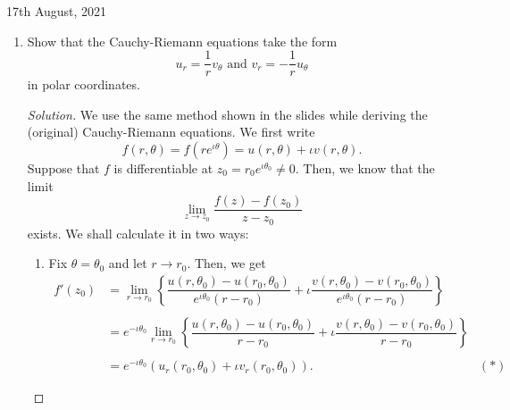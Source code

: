 \documentclass[11pt]{article}
\theoremstyle{definition}
\newenvironment{soln}{\begin{proof}[Solution]}{\end{proof}}
\begin{document}
\begin{center}
    17th August, 2021
\end{center}
\begin{enumerate}[leftmargin=*]
    \itemsep0.5em
    \item Show that the Cauchy-Riemann equations take the form 
    \[
        u_r = \frac{1}{r} v_{\theta} \text{ and } v_r = -\frac{1}{r} u_{\theta} 
    \]
    in polar coordinates.
    
    \begin{soln}
    We use the same method shown in the slides while deriving the (original) Cauchy-Riemann equations. We first write
		\[
			f(r, \theta) = f(re^{\iota\theta}) = u(r, \theta) + \iota v(r, \theta).
		\]
		Suppose that $f$ is differentiable at $z_0 = r_0e^{\iota\theta_0} \neq 0$. Then, we know that the limit
		\[
			\lim_{z\to z_0}\frac{f(z) - f(z_0)}{z - z_0}
		\]
		exists. We shall calculate it in two ways:
		\begin{enumerate}
			\item Fix $\theta = \theta_0$ and let $r \to r_0.$ Then, we get
			\begin{align*} 
				f'(z_0) &= \lim_{r\to r_0}\left\{\dfrac{u(r, \theta_0) - u(r_0, \theta_0)}{e^{\iota\theta_0}(r - r_0)} + \iota\dfrac{v(r, \theta_0) - v(r_0, \theta_0)}{e^{\iota\theta_0}(r - r_0)}\right\}\\~\\
				&= e^{-\iota\theta_0}\lim_{r\to r_0}\left\{\dfrac{u(r, \theta_0) - u(r_0, \theta_0)}{r - r_0} + \iota\dfrac{v(r, \theta_0) - v(r_0, \theta_0)}{r - r_0}\right\}\\~\\
				&= e^{-\iota\theta_0}\left(u_r(r_0, \theta_0) + \iota v_r(r_0, \theta_0)\right). & (*)
			\end{align*}


\end{enumerate}
\end{soln}
\end{enumerate}
\end{document}
